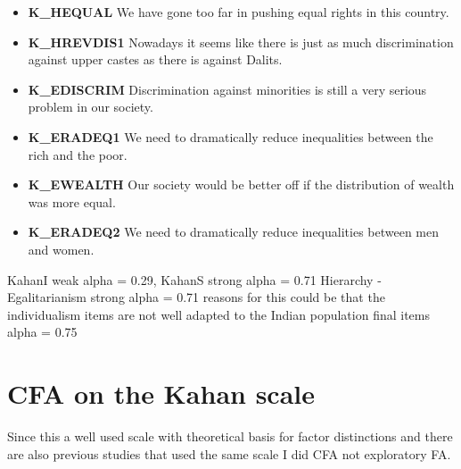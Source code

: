 \documentclass[
]{article}
\providecommand{\tightlist}{%
  \setlength{\itemsep}{0pt}\setlength{\parskip}{0pt}}
\begin{document}
\begin{itemize}
\tightlist
\item
  \textbf{K\_HEQUAL} We have gone too far in pushing equal rights in
  this country.
\item
  \textbf{K\_HREVDIS1} Nowadays it seems like there is just as much
  discrimination against upper castes as there is against Dalits.
\item
  \textbf{K\_EDISCRIM} Discrimination against minorities is still a very
  serious problem in our society.
\item
  \textbf{K\_ERADEQ1} We need to dramatically reduce inequalities
  between the rich and the poor.
\item
  \textbf{K\_EWEALTH} Our society would be better off if the
  distribution of wealth was more equal.
\item
  \textbf{K\_ERADEQ2} We need to dramatically reduce inequalities
  between men and women.
\end{itemize}

KahanI weak alpha = 0.29, KahanS strong alpha = 0.71 Hierarchy
-Egalitarianism strong alpha = 0.71 reasons for this could be that the
individualism items are not well adapted to the Indian population final
items alpha = 0.75

\newpage

\hypertarget{cfa-on-the-kahan-scale}{%
\section{CFA on the Kahan scale}\label{cfa-on-the-kahan-scale}}

Since this a well used scale with theoretical basis for factor
distinctions and there are also previous studies that used the same
scale I did CFA not exploratory FA.
\end{document}
